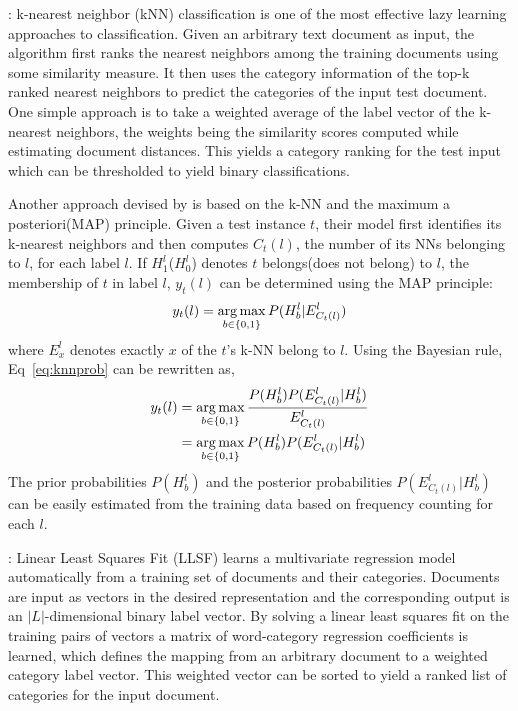  : k-nearest neighbor (kNN) classification is 
one of the most effective lazy learning approaches to classification. 
Given an arbitrary text document as input, the algorithm first ranks 
the nearest neighbors among the training documents using some 
similarity measure. It then uses the category information of the top-k 
ranked nearest neighbors to predict the categories of the input test 
document. One simple approach is to take a weighted average of the 
label vector of the k-nearest neighbors, the weights being the similarity 
scores computed while estimating document distances. This yields a 
category ranking for the test input which can be thresholded to yield 
binary classifications.

Another approach devised by \citet{zhang2007ml} is based on the k-NN and the maximum a posteriori(MAP) principle. Given a test instance $t$, their model first identifies its k-nearest neighbors and then computes $C_{t}(l)$, the number of its NNs belonging to $l$, for each label $l$. If $H^{l}_{1}$($H^{l}_{0}$) denotes $t$ belongs(does not belong) to $l$, the membership of $t$ in label $l$, $y_{t}(l)$ can be determined using the MAP principle:
\begin{equation}
\label{eq:knnprob}
y_{t}(l) = \operatorname*{arg\,max}_{b \in \{0, 1\}} P(H^{l}_{b}|E^{l}_{C_{t}(l)})
\end{equation}
where $E^{l}_{x}$ denotes exactly $x$ of the $t$'s k-NN belong to $l$. Using the Bayesian rule, Eq~\ref{eq:knnprob} can be rewritten as,
\begin{align}
y_{t}(l) &= \operatorname*{arg\,max}_{b \in \{0, 1\}} \frac{ P(H^{l}_{b}) P(E^{l}_{C_{t}(l)} | H^{l}_{b}) } {E^{l}_{C_{t}(l)}} \\
&= \operatorname*{arg\,max}_{b \in \{0, 1\}} P(H^{l}_{b}) P(E^{l}_{C_{t}(l)} | H^{l}_{b})
\end{align}
The prior probabilities $P(H^{l}_{b})$ and the posterior probabilities $P(E^{l}_{C_{t}(l)} | H^{l}_{b})$ can be easily estimated from the training data based on frequency counting for each $l$.



 : Linear Least Squares Fit (LLSF) \citep{yang1992linear} learns a multivariate regression model automatically from a training set of documents and their categories. Documents are input as vectors in the desired representation and the corresponding output is an $|L|$-dimensional binary label vector. By solving a linear least squares fit on the training pairs of vectors a matrix of word-category regression coefficients is learned, which defines the mapping from an arbitrary document to a weighted category label vector. This weighted vector can be sorted to yield a ranked list of categories for the input document.

